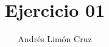 \documentclass[11pt,legalpaper,twocolumn]{article}
\author{Andrés Limón Cruz}
\title{Ejercicio 01}
\begin{document}
 \lipsum
\end{document}
